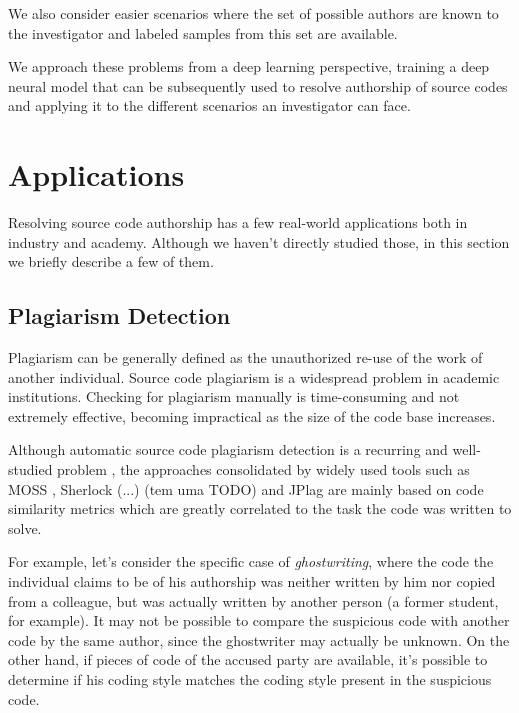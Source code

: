 We also consider easier scenarios where the set of possible authors are known to the investigator and labeled samples from this set are available. %

We approach these problems from a deep learning perspective, training a deep neural model that can be subsequently used to resolve authorship of source codes and applying it to the different scenarios an investigator can face.

\section{Applications}

Resolving source code authorship has a few real-world applications both in industry and academy. Although we haven't directly studied those, in this section we briefly describe a few of them.

\subsection{Plagiarism Detection}

Plagiarism can be generally defined as the unauthorized re-use of the work of another individual. Source code plagiarism is a widespread problem in academic institutions. Checking for plagiarism manually is time-consuming and not extremely effective, becoming impractical as the size of the code base increases.

Although automatic source code plagiarism detection is a recurring and well-studied problem \cite{plag_survey}, the approaches consolidated by widely used tools such as MOSS \cite{moss}, Sherlock (...) (tem uma TODO) and JPlag \cite{jplag} are mainly based on code similarity metrics which are greatly correlated to the task the code was written to solve.%

For example, let's consider the specific case of \textit{ghostwriting}, where the code the individual claims to be of his authorship was neither written by him nor copied from a colleague, but was actually written by another person (a former student, for example).  It may not be possible to compare the suspicious code with another code by the same author, since the ghostwriter may actually be unknown. On the other hand, if pieces of code of the accused party are available, it's possible to determine if his coding style matches the coding style present in the suspicious code.

